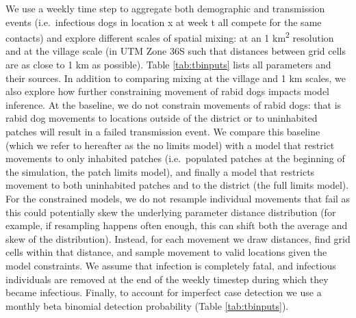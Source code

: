 \documentclass[
  oneside]{book}
\begin{document}
We use a weekly time step to aggregate both demographic and transmission events (i.e.~infectious dogs in location x at week t all compete for the same contacts) and explore different scales of spatial mixing: at an 1 km\textsuperscript{2} resolution and at the village scale (in UTM Zone 36S such that distances between grid cells are as close to 1 km as possible). Table \ref{tab:tbinputs} lists all parameters and their sources. In addition to comparing mixing at the village and 1 km scales, we also explore how further constraining movement of rabid dogs impacts model inference. At the baseline, we do not constrain movements of rabid dogs: that is rabid dog movements to locations outside of the district or to uninhabited patches will result in a failed transmission event. We compare this baseline (which we refer to hereafter as the no limits model) with a model that restrict movements to only inhabited patches (i.e.~populated patches at the beginning of the simulation, the patch limits model), and finally a model that restricts movement to both uninhabited patches and to the district (the full limits model). For the constrained models, we do not resample individual movements that fail as this could potentially skew the underlying parameter distance distribution (for example, if resampling happens often enough, this can shift both the average and skew of the distribution). Instead, for each movement we draw distances, find grid cells within that distance, and sample movement to valid locations given the model constraints. We assume that infection is completely fatal, and infectious individuals are removed at the end of the weekly timestep during which they became infectious. Finally, to account for imperfect case detection we use a monthly beta binomial detection probability (Table \ref{tab:tbinputs}).
\end{document}
